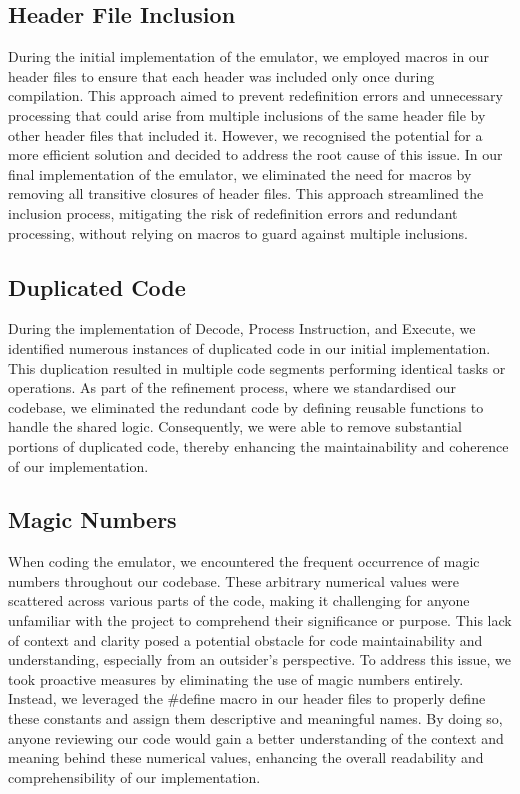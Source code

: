 \documentclass[10pt]{article}
\begin{document}
\subsection{Header File Inclusion}
During the initial implementation of the emulator, we employed macros in our header files to ensure that each header was included only once during compilation. This approach aimed to prevent redefinition errors and unnecessary processing that could arise from multiple inclusions of the same header file by other header files that included it. However, we recognised the potential for a more efficient solution and decided to address the root cause of this issue. In our final implementation of the emulator, we eliminated the need for macros by removing all transitive closures of header files. This approach streamlined the inclusion process, mitigating the risk of redefinition errors and redundant processing, without relying on macros to guard against multiple inclusions.

\subsection{Duplicated Code}
During the implementation of Decode, Process Instruction, and Execute, we identified numerous instances of duplicated code in our initial implementation. This duplication resulted in multiple code segments performing identical tasks or operations. As part of the refinement process, where we standardised our codebase, we eliminated the redundant code by defining reusable functions to handle the shared logic. Consequently, we were able to remove substantial portions of duplicated code, thereby enhancing the maintainability and coherence of our implementation.

\subsection{Magic Numbers}
When coding the emulator, we encountered the frequent occurrence of magic numbers throughout our codebase. These arbitrary numerical values were scattered across various parts of the code, making it challenging for anyone unfamiliar with the project to comprehend their significance or purpose. This lack of context and clarity posed a potential obstacle for code maintainability and understanding, especially from an outsider's perspective. To address this issue, we took proactive measures by eliminating the use of magic numbers entirely. Instead, we leveraged the \#define macro in our header files to properly define these constants and assign them descriptive and meaningful names. By doing so, anyone reviewing our code would gain a better understanding of the context and meaning behind these numerical values, enhancing the overall readability and comprehensibility of our implementation.
\end{document}
